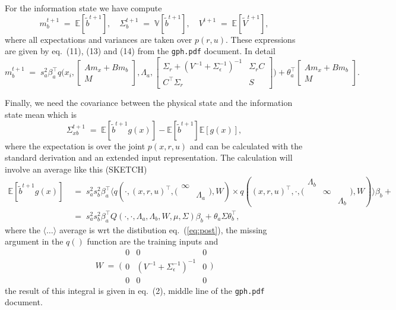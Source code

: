 \documentclass{article}
\newcommand{\E}{{\mathbb E}}
\newcommand{\V}{{\mathbb V}}
\begin{document}
For the information state we have compute
\begin{equation}
m_b^{t+1}\;=\;\E[\tilde b^{t+1}],\quad
 \Sigma_b^{t+1}\;=\;\V[\tilde b^{t+1}],\quad
V^{t+1}\;=\;\E[\tilde V^{t+1}],
\end{equation}
where all expectations and variances are taken over $p(r,u)$. These
expressions are given by eq.~(11), (13) and (14) from the
\texttt{gph.pdf} document. In detail
\begin{equation}
m_b^{t+1}\;=\;s_a^2\beta_a^\top q\Big(\!x_i,
\left[\!\!\begin{array}{c}Am_x\!+\!Bm_b\\M\end{array}\!\!\right],\Lambda_a,
\left[\!\!\begin{array}{cc}\Sigma_r+(V^{-1}+\Sigma_\epsilon^{-1})^{-1}&\Sigma_rC\\
C^\top\Sigma_r&S\end{array}\!\!\right]\!\Big) 
+\theta_a^\top\left[\!\!\begin{array}{c}Am_x\!+\!Bm_b\\M\end{array}\!\!\right].
\end{equation}

Finally, we need the covariance between the physical state and the
information state mean which is 
\begin{equation}
\Sigma_{xb}^{t+1}\;=\;\E[\tilde b^{t+1}g(x)]-\E[\tilde b^{t+1}]\E[g(x)],
\end{equation}
where the expectation is over the joint $p(x,r,u)$ and can be
calculated with the standard derivation and an extended input
representation. The calculation will involve an average like this (SKETCH)
\begin{equation}
\begin{split}
\E[\tilde b^{t+1}g(x)]\;&=\;s_a^2s_b^2\beta_a^\top\langle q(\cdot,(x,r,u)^\top,\Big(\!\begin{array}{cc}\infty&\\
  &\Lambda_a\end{array}\!\Big),W)
\times
q((x,r,u)^\top,\cdot,\Big(\!\begin{array}{ccc}\Lambda_b&&\\ &\infty&\\
&&\Lambda_b\end{array}\!\Big),W)\rangle\beta_b+\\
&=\;s_a^2s_b^2\beta_a^\top
Q(\cdot,\cdot,\Lambda_a,\Lambda_b,W,\mu,\Sigma)\beta_b+\theta_a\Sigma\theta_b^\top,
\end{split}
\end{equation}
where the $\langle\ldots\rangle$ average is wrt the distibution
eq.~(\ref{eq:post}), the missing argument in the $q()$ function are
the training inputs and
\begin{equation}
W\;=\;\Big(\!\begin{array}{ccc}0&0&0\\0&(V^{-1}+\Sigma_\epsilon^{-1})^{-1}&0\\0&0&0\end{array}\!\Big)
\end{equation}
the result of this integral is given in eq.~(2), middle line of the
\texttt{gph.pdf} document.
\end{document}
